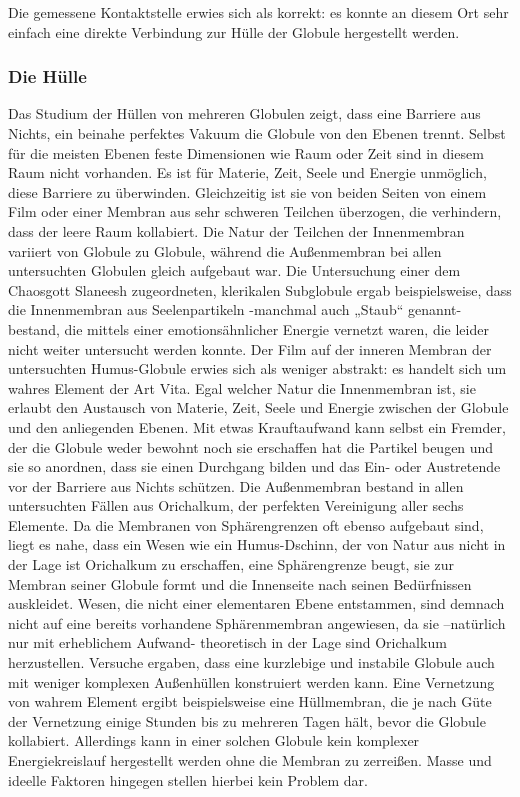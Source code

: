 \documentclass[a5paper,8pt]{book}
\begin{document}
Die gemessene Kontaktstelle erwies sich als korrekt: es konnte an diesem Ort sehr einfach eine direkte Verbindung zur Hülle 
der Globule hergestellt werden.

\subsubsection{Die Hülle}
Das Studium der Hüllen von mehreren Globulen zeigt, dass eine Barriere aus Nichts, ein beinahe perfektes Vakuum die Globule 
von den Ebenen trennt. Selbst für die meisten Ebenen feste Dimensionen wie Raum oder Zeit sind in diesem Raum nicht 
vorhanden. Es ist für Materie, Zeit, Seele und Energie unmöglich, diese Barriere zu überwinden. Gleichzeitig ist sie von 
beiden Seiten von einem Film oder einer Membran aus sehr schweren Teilchen überzogen, die verhindern, dass der leere Raum 
kollabiert. Die Natur der Teilchen der Innenmembran variiert von Globule zu Globule, während die Außenmembran bei allen 
untersuchten Globulen gleich aufgebaut war. 
Die Untersuchung einer dem Chaosgott Slaneesh zugeordneten, klerikalen Subglobule ergab beispielsweise, dass die 
Innenmembran aus Seelenpartikeln -manchmal auch „Staub“ genannt- bestand, die mittels einer emotionsähnlicher Energie 
vernetzt waren, die leider nicht weiter untersucht werden konnte. 
Der Film auf der inneren Membran der untersuchten Humus-Globule erwies sich als weniger abstrakt: es handelt sich um wahres 
Element der Art Vita. 
Egal welcher Natur die Innenmembran ist, sie erlaubt den Austausch von Materie, Zeit, Seele und Energie zwischen der Globule und den anliegenden Ebenen. Mit etwas Krauftaufwand kann selbst ein Fremder, der die Globule weder bewohnt noch sie erschaffen hat die Partikel beugen und sie so anordnen, dass sie einen Durchgang bilden und das Ein- oder Austretende vor der Barriere aus Nichts schützen. 
Die Außenmembran bestand in allen untersuchten Fällen aus Orichalkum, der perfekten Vereinigung aller sechs Elemente. Da die Membranen von Sphärengrenzen oft ebenso aufgebaut sind, liegt es nahe, dass ein Wesen wie ein Humus-Dschinn, der von Natur aus nicht in der Lage ist Orichalkum zu erschaffen, eine Sphärengrenze beugt, sie zur Membran seiner Globule formt und die Innenseite nach seinen Bedürfnissen auskleidet. Wesen, die nicht einer elementaren Ebene entstammen, sind demnach nicht auf eine bereits vorhandene Sphärenmembran angewiesen, da sie –natürlich nur mit erheblichem Aufwand- theoretisch in der Lage sind Orichalkum herzustellen.
Versuche ergaben, dass eine kurzlebige und instabile Globule auch mit weniger komplexen Außenhüllen konstruiert werden kann. Eine Vernetzung von wahrem Element ergibt beispielsweise eine Hüllmembran, die je nach Güte der Vernetzung einige Stunden bis zu mehreren Tagen hält, bevor die Globule kollabiert. Allerdings kann in einer solchen Globule kein komplexer Energiekreislauf hergestellt werden ohne die Membran zu zerreißen. Masse und ideelle Faktoren hingegen stellen hierbei kein Problem dar. 
\end{document}
